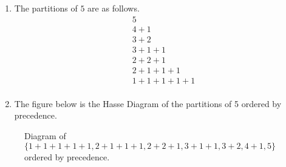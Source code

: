 \documentclass[12pt]{article}
\begin{document}
\renewcommand{\theenumi}{\alph{enumi}}
\begin{enumerate}
    \item The partitions of $5$ are as follows.
    \begin{equation*}
        \begin{split}
            & 5 \\
            & 4 + 1 \\
            & 3 + 2 \\
            & 3 + 1 + 1 \\
            & 2 + 2 + 1 \\
            & 2 + 1 + 1 + 1 \\
            & 1 + 1 + 1 + 1 + 1 \\
        \end{split}
    \end{equation*}
    \item The figure below is the Hasse Diagram of the partitions of 5 ordered by precedence.
\end{enumerate}

\begin{figure}[H]
\centering
{} \caption{Diagram of $\{1 + 1 + 1 + 1 + 1, 2 + 1 + 1 + 1, 2 + 2 + 1, 3 + 1 + 1, 3 + 2, 4 + 1, 5\}$ ordered by precedence.}
\end{figure}
\end{document}
